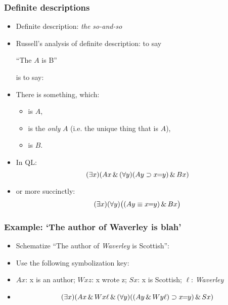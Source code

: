 \begin{frame}
    \frametitle{Definite descriptions}

\begin{itemize}[<+->]
\item Definite description: \emph{the so-and-so}
\item Russell's analysis of definite description: to say\\[1ex]
\centerline{``The $A$ is B''}
is to say:
\item There is something, which:
\begin{itemize}[<+->]
\item is $A$,
\item is the \emph{only} $A$ (i.e. the unique thing that is $A$),
\item is $B$.
\end{itemize}
\item In QL:
\[
(\exists x)(Ax \,\&\, (\forall y)(Ay \supset x\!\!=\!\!y) \,\&\, Bx)
\]
\item or more succinctly:
\[
(\exists x)(\forall y)\big((Ay \equiv x\!\!=\!\!y) \,\&\, Bx\big)
\]
\end{itemize}
\end{frame}



\begin{frame}
\frametitle{Example: `The author of Waverley is blah'}

\begin{itemize}[<+->]

\item Schematize ``The author of \textit{Waverley} is Scottish'':

\item Use the following symbolization key:

\item $Ax$: x is an author; $Wxz$: x wrote z; $Sx$: x is Scottish; $\ell$: \textit{Waverley}
\item[]
\[
(\exists x)(Ax \,\&\, Wx\ell \,\&\, (\forall y)( (Ay \,\&\, Wy\ell) \supset x\!\!=\!\!y) \,\&\, Sx)
\]


\end{itemize}
\end{frame}

